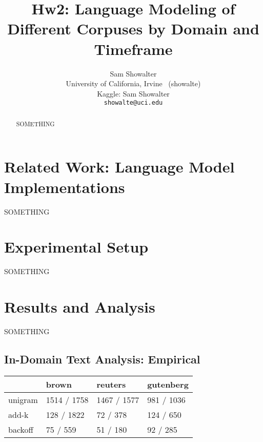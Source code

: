 \documentclass[11pt,a4paper]{article}
\title{Hw2: Language Modeling of Different Corpuses by Domain and Timeframe}
\author{Sam Showalter \\
  University of California, Irvine \ (showalte) \\  
  Kaggle: Sam Showalter \\
\texttt{showalte@uci.edu}}
\date{}
\begin{document}
\maketitle
\begin{abstract}
  SOMETHING \cite{zhang2010understanding}
\end{abstract}


\section{Related Work: Language Model Implementations}

SOMETHING


\section{Experimental Setup}%
\label{sec:experimental_setup}

SOMETHING


\section{Results and Analysis}%
\label{sec:results_analysis}

SOMETHING


\subsection{In-Domain Text Analysis: Empirical}%
\label{sec:in_domain_text_analysis_empirical}


\begin{tabular}{llll}
\hline
         & brown       & reuters     & gutenberg   \\
\hline
 unigram & 1514 / 1758 & 1467 / 1577 & 981 / 1036  \\
 add-k   & 128 / 1822  & 72 / 378    & 124 / 650   \\
 backoff & 75 / 559    & 51 / 180    & 92 / 285    \\
\hline
\end{tabular}
\end{document}
